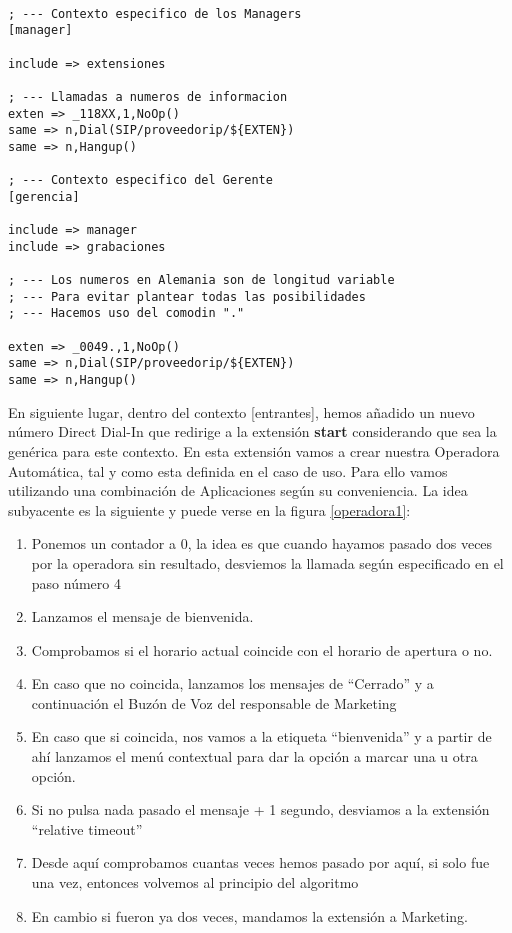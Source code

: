 \begin{lstlisting}[style=bash,title={/etc/asterisk/extensions.conf}]

; --- Contexto especifico de los Managers
[manager]

include => extensiones

; --- Llamadas a numeros de informacion
exten => _118XX,1,NoOp()
same => n,Dial(SIP/proveedorip/${EXTEN})
same => n,Hangup()

; --- Contexto especifico del Gerente
[gerencia]

include => manager
include => grabaciones

; --- Los numeros en Alemania son de longitud variable
; --- Para evitar plantear todas las posibilidades
; --- Hacemos uso del comodin "."

exten => _0049.,1,NoOp()
same => n,Dial(SIP/proveedorip/${EXTEN})
same => n,Hangup()

\end{lstlisting}

En siguiente lugar, dentro del contexto [entrantes], hemos añadido un nuevo número Direct Dial-In que redirige a la extensión \textbf{start} considerando que sea la genérica para este contexto. En esta extensión vamos a crear nuestra Operadora Automática, tal y como esta definida en el caso de uso. Para ello vamos utilizando una combinación de Aplicaciones según su conveniencia. La idea subyacente es la siguiente y puede verse en la figura \ref{operadora1}:

\begin{enumerate}

\item Ponemos un contador a 0, la idea es que cuando hayamos pasado dos veces por la operadora sin resultado, desviemos la llamada según especificado en el paso número 4
\item Lanzamos el mensaje de bienvenida.
\item Comprobamos si el horario actual coincide con el horario de apertura o no. 
\item En caso que no coincida, lanzamos los mensajes de ``Cerrado'' y a continuación el Buzón de Voz del responsable de Marketing
\item En caso que si coincida, nos vamos a la etiqueta ``bienvenida'' y a partir de ahí lanzamos el menú contextual para dar la opción a marcar una u otra opción. 
\item Si no pulsa nada pasado el mensaje + 1 segundo, desviamos a la extensión ``relative timeout'' 
\item Desde aquí comprobamos cuantas veces hemos pasado por aquí, si solo fue una vez, entonces volvemos al principio del algoritmo
\item En cambio si fueron ya dos veces, mandamos la extensión a Marketing.

\end{enumerate}

